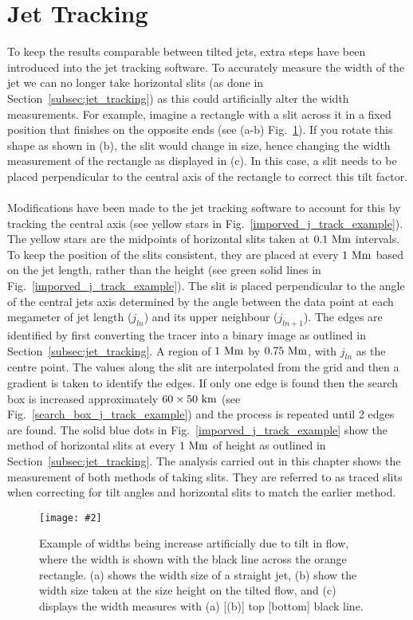 \documentclass[12pt]{ociamthesis}
\newcommand{\mfig}[4]{
  \begin{figure}
  \begin{center}
  \texttt{[image: \#2]}
  \caption{#3}
  \label{#4}
  \end{center}
  \end{figure}}
\newcommand{\np}{\\ \\}
\begin{document}
\section{Jet Tracking}
\label{sec:tjt}
To keep the results comparable between tilted jets, extra steps have been introduced into the jet tracking software. To accurately measure the width of the jet we can no longer take horizontal slits (as done in Section~\ref{subsec:jet_tracking}) as this could artificially alter the width measurements. For example, imagine a rectangle with a slit across it in a fixed position that finishes on the opposite ends (see (a-b) Fig.~\ref{slit_example}). If you rotate this shape as shown in (b), the slit would change in size, hence changing the width measurement of the rectangle as displayed in (c). In this case, a slit needs to be placed perpendicular to the central axis of the rectangle to correct this tilt factor. \np
%
Modifications have been made to the jet tracking software to account for this by tracking the central axis (see yellow stars in Fig.~\ref{imporved_j_track_example}). The yellow stars are the midpoints of horizontal slits taken at $0.1~\rm{Mm}$ intervals. To keep the position of the slits consistent, they are placed at every $1~\rm{Mm}$ based on the jet length, rather than the height (see green solid lines in Fig.~\ref{imporved_j_track_example}). The slit is placed perpendicular to the angle of the central jets axis determined by the angle between the data point at each megameter of jet length ($j_{ln}$) and its upper neighbour ($j_{ln+1}$). The edges are identified by first converting the tracer into a binary image as outlined in Section~\ref{subsec:jet_tracking}. A region of $1~\rm{Mm}$ by $0.75~\rm{Mm}$, with $j_{ln}$ as the centre point. The values along the slit are interpolated from the grid and then a gradient is taken to identify the edges. If only one edge is found then the search box is increased approximately $60\times 50~\rm{km}$ (see Fig.~\ref{search_box_j_track_example}) and the process is repeated until 2 edges are found. The solid blue dots in  Fig.~\ref{imporved_j_track_example} show the method of horizontal slits at every $1~\rm{Mm}$ of height as outlined in Section~\ref{subsec:jet_tracking}. The analysis carried out in this chapter shows the measurement of both methods of taking slits. They are referred to as traced slits when correcting for tilt angles and horizontal slits to match the earlier method.
\mfig{0.65}{figures/slit_size_example.png}{Example of widths being increase artificially due to tilt in flow, where the width is shown with the black line across the orange rectangle. (a) shows the width size of a straight jet, (b) show the width size taken at the size height on the tilted flow, and (c) displays the width measures with (a) [(b)] top [bottom] black line.}{slit_example}
\end{document}
